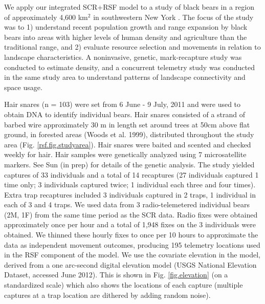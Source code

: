 \documentclass[12pt]{article}
\begin{document}
We apply our integrated SCR+RSF model to a study of black bears in a
region of approximately 4,600 km$^2$ in southwestern New York \citep{sun:inprep}.
 The focus of the study was to 1) understand recent
population growth and range expansion by black bears into areas with
higher levels of human density and agriculture than the traditional
range, and 2) evaluate resource selection and movements in relation to
landscape characteristics.  A noninvasive, genetic, mark-recapture
study was conducted to estimate density, and a concurrent telemetry
study was conducted in the same study area to understand patterns of
landscape connectivity and space usage.
 
Hair snares (n = 103) were set from 6 June - 9 July, 2011 and were
used to obtain DNA to identify individual bears.  Hair snares
consisted of a strand of barbed wire approximately 30 m in length set
around trees at 50cm above flat ground, in forested areas (Woods et
al. 1999), distributed throughout the study area (Fig. \ref{rsf.fig.studyarea}). Hair snares
were baited and scented and checked weekly for hair. Hair samples were
genetically analyzed using 7 microsatellite markers. See Sun (in prep)
for details of the genetic analysis. 
 The study yielded
captures of 33 individuals and a total of 14 recaptures (27
individuals captured 1 time only; 3 individuals captured twice; 1
individual each three and four times). Extra trap recaptures included
3 individuals captured in 2 traps, 1 individual in each of 3 and 4
traps.  We used data from 3 radio-telemetered individual bears (2M,
1F) from the same time period as the SCR data. Radio fixes were
obtained approximately once per hour and a total of 1,948 fixes on the
3 individuals were obtained. We thinned these hourly fixes to once per
10 hours to approximate the data as independent movement outcomes,
producing 195 telemetry locations used in the RSF component of the
model.  We use the covariate elevation in the model, derived from a
one arc-second digital elevation model (USGS National Elevation
Dataset, accessed June 2012).  This is shown in
Fig. \ref{fig.elevation} (on a
standardized scale) which also shows the locations of each capture
(multiple captures at a trap location are dithered by adding random
noise).  
\end{document}
